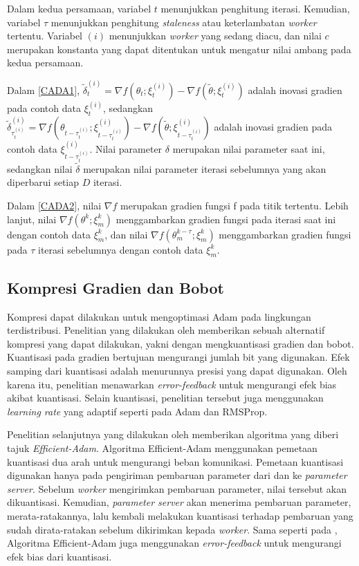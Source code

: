 Dalam kedua persamaan, variabel $t$ menunjukkan penghitung iterasi. Kemudian, variabel $\tau$ menunjukkan penghitung \emph{staleness} atau keterlambatan \emph{worker} tertentu. Variabel $(i)$ menunjukkan \emph{worker} yang sedang diacu, dan nilai $c$ merupakan konstanta yang dapat ditentukan untuk mengatur nilai ambang pada kedua persamaan.

Dalam \autoref{CADA1}, $\tilde{\delta}_t^{(i)} = \nabla f(\theta_t;\xi_t^{(i)}) - \nabla f(\tilde{\theta};\xi_t^{(i)})$ adalah inovasi gradien pada contoh data $\xi_t^{(i)}$, sedangkan $\tilde{\delta}_{\tau_t^{(i)}}^{(i)} = \nabla f(\theta_{t-\tau_t^{(i)}};\xi_{t-\tau_t^{(i)}}^{(i)}) - \nabla f(\tilde{\theta};\xi_{t-\tau_t^{(i)}}^{(i)})$ adalah inovasi gradien pada contoh data $\xi_{t-\tau_t^{(i)}}^{(i)}$. Nilai parameter $\delta$ merupakan nilai parameter saat ini, sedangkan nilai $\tilde{\delta}$ merupakan nilai parameter iterasi sebelumnya yang akan diperbarui setiap $D$ iterasi.

Dalam \autoref{CADA2}, nilai $\nabla f$ merupakan gradien fungsi f pada titik tertentu. Lebih lanjut, nilai $\nabla f(\theta^k;\xi^k_m)$ menggambarkan gradien fungsi pada iterasi saat ini dengan contoh data $\xi^k_m$, dan nilai $\nabla f(\theta^{k-\tau}_m;\xi^k_m)$ menggambarkan gradien fungsi pada $\tau$ iterasi sebelumnya dengan contoh data $\xi^k_m$.

\subsection{Kompresi Gradien dan Bobot}
Kompresi dapat dilakukan untuk mengoptimasi Adam pada lingkungan terdistribusi. Penelitian yang dilakukan oleh \textcite{Chen2021Quantized} memberikan sebuah alternatif kompresi yang dapat dilakukan, yakni dengan mengkuantisasi gradien dan bobot. Kuantisasi pada gradien bertujuan mengurangi jumlah bit yang digunakan. Efek samping dari kuantisasi adalah menurunnya presisi yang dapat digunakan. Oleh karena itu, penelitian \textcite{Chen2021Quantized} menawarkan \emph{error-feedback} untuk mengurangi efek bias akibat kuantisasi. Selain kuantisasi, penelitian tersebut juga menggunakan \emph{learning rate} yang adaptif seperti pada Adam dan RMSProp.

Penelitian selanjutnya yang dilakukan oleh \textcite{Chen2022Efficient} memberikan algoritma yang diberi tajuk \emph{Efficient-Adam}. Algoritma Efficient-Adam menggunakan pemetaan kuantisasi dua arah untuk mengurangi beban komunikasi. Pemetaan kuantisasi digunakan hanya pada pengiriman pembaruan parameter dari dan ke \emph{parameter server}. Sebelum \emph{worker} mengirimkan pembaruan parameter, nilai tersebut akan dikuantisasi. Kemudian, \emph{parameter server} akan menerima pembaruan parameter, merata-ratakannya, lalu kembali melakukan kuantisasi terhadap pembaruan yang sudah dirata-ratakan sebelum dikirimkan kepada \emph{worker}. Sama seperti pada \textcite{Chen2021Quantized}, Algoritma Efficient-Adam juga menggunakan \emph{error-feedback} untuk mengurangi efek bias dari kuantisasi.

